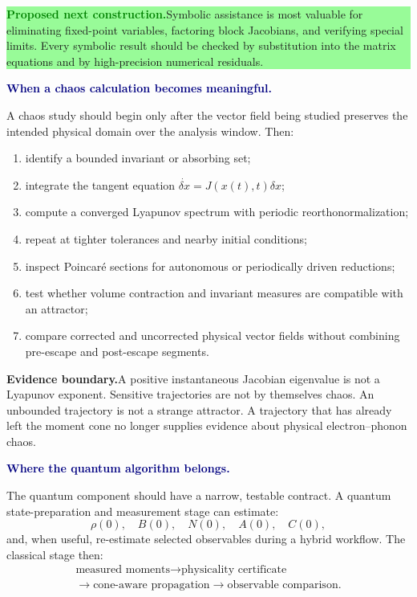 \documentclass[10pt]{article}
\newcommand{\proposalbox}[1]{%
  \par\medskip
  \noindent\colorbox{palegreen}{%
    \parbox{\dimexpr\linewidth-2\fboxsep\relax}{%
      \textcolor{green}{\textbf{Proposed next construction.}}\quad #1%
    }%
  }\par\medskip
}
\newcommand{\warningbox}[1]{%
  \par\medskip
  \noindent\colorbox{palered}{%
    \parbox{\dimexpr\linewidth-2\fboxsep\relax}{%
      \textcolor{brick}{\textbf{Evidence boundary.}}\quad #1%
    }%
  }\par\medskip
}
\newcommand{\flowlead}[1]{%
  \par\medskip
  \needspace{3\baselineskip}%
  \noindent\textcolor{navy}{\textbf{#1.}}\enspace\ignorespaces
}
\begin{document}
\proposalbox{Symbolic assistance is most valuable for eliminating fixed-point
variables, factoring block Jacobians, and verifying special limits.  Every
symbolic result should be checked by substitution into the matrix equations
and by high-precision numerical residuals.}

\flowlead{When a chaos calculation becomes meaningful}

A chaos study should begin only after the vector field being studied preserves
the intended physical domain over the analysis window.  Then:
\begin{enumerate}
  \item identify a bounded invariant or absorbing set;
  \item integrate the tangent equation
  \(\dot{\delta x}=J(x(t),t)\delta x\);
  \item compute a converged Lyapunov spectrum with periodic
  reorthonormalization;
  \item repeat at tighter tolerances and nearby initial conditions;
  \item inspect Poincar\'e sections for autonomous or periodically driven
  reductions;
  \item test whether volume contraction and invariant measures are
  compatible with an attractor;
  \item compare corrected and uncorrected physical vector fields without
  combining pre-escape and post-escape segments.
\end{enumerate}

\warningbox{A positive instantaneous Jacobian eigenvalue is not a Lyapunov
exponent.  Sensitive trajectories are not by themselves chaos.  An unbounded
trajectory is not a strange attractor.  A trajectory that has already left
the moment cone no longer supplies evidence about physical electron--phonon
chaos.}

\flowlead{Where the quantum algorithm belongs}

The quantum component should have a narrow, testable contract.  A quantum
state-preparation and measurement stage can estimate:
\[
\rho(0),\quad B(0),\quad N(0),\quad A(0),\quad C(0),
\tag{7.3}
\]
and, when useful, re-estimate selected observables during a hybrid workflow.
The classical stage then:
\[
\begin{gathered}
\text{measured moments}
\longrightarrow
\text{physicality certificate}\\
\longrightarrow
\text{cone-aware propagation}
\longrightarrow
\text{observable comparison}.
\end{gathered}
\tag{7.4}
\]
\end{document}
